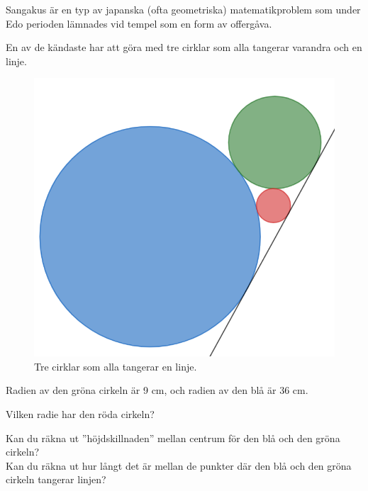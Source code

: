 
Sangakus är en typ av japanska (ofta geometriska) matematikproblem som under Edo perioden lämnades vid tempel som en form av offergåva.

En av de kändaste har att göra med tre cirklar som alla tangerar varandra och en linje.
\begin{figure}[H]
    \centering
    \includegraphics[width=0.5\linewidth]{img/tre cirklar.png}
    \caption{Tre cirklar som alla tangerar en linje.}
\end{figure}


Radien av den gröna cirkeln är 9 cm, och radien av den blå är 36 cm.

Vilken radie har den röda cirkeln?

\begin{rem}
    Kan du räkna ut ''höjdskillnaden'' mellan centrum för den blå och den gröna cirkeln?\\
    Kan du räkna ut hur långt det är mellan de punkter där den blå och den gröna cirkeln tangerar linjen?
\end{rem}